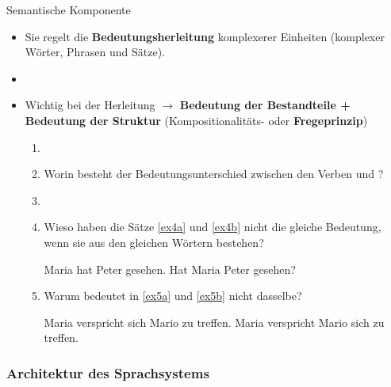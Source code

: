 \begin{frame}{Semantische Komponente}
	
	\begin{itemize}
		\item Sie regelt die \textbf{Bedeutungsherleitung} komplexerer Einheiten (komplexer Wörter, Phrasen und Sätze).
		\item[]
		\item<2-> Wichtig bei der Herleitung $\rightarrow$ \textbf{Bedeutung der Bestandteile + Bedeutung der Struktur} (Kompositionalitäts- oder \textbf{Fregeprinzip})
				
		\begin{enumerate}
			\item[]
			\item<3->[$\rightarrow$] Worin besteht der Bedeutungsunterschied zwischen den Verben  und ?
			\item[]
			\item<4->[$\rightarrow$] Wieso haben die Sätze \ref{ex4a} und \ref{ex4b} nicht die gleiche Bedeutung, wenn sie aus den gleichen Wörtern bestehen?

\eal	
	\ex Maria hat Peter gesehen. \label{ex4a}
	\ex Hat Maria Peter gesehen? \label{ex4b}
\zl

			\item<5->[$\rightarrow$] Warum bedeutet  in \ref{ex5a} und \ref{ex5b} nicht dasselbe?
	
\eal
	\ex Maria verspricht sich Mario zu treffen. \label{ex5a}
	\ex Maria verspricht Mario sich zu treffen. \label{ex5b}
\zl

		\end{enumerate}
		
	\end{itemize}
	
\end{frame}


%
\subsubsection{Architektur des Sprachsystems}
%
		
